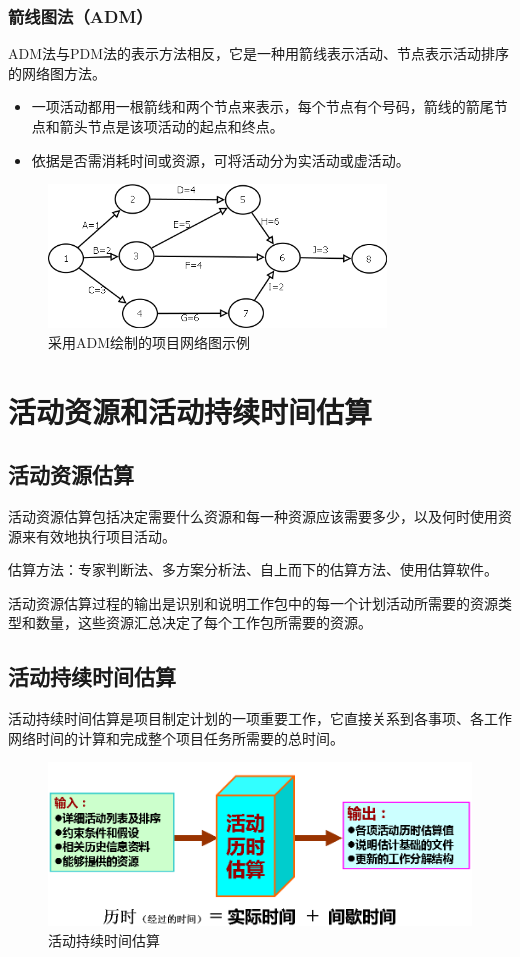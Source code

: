 \subsubsection{箭线图法（ADM）}
ADM法与PDM法的表示方法相反，它是一种用箭线表示活动、节点表示活动排序的网络图方法。
\begin{itemize}
	\item 一项活动都用一根箭线和两个节点来表示，每个节点有个号码，箭线的箭尾节点和箭头节点是该项活动的起点和终点。
	\item 依据是否需消耗时间或资源，可将活动分为实活动或虚活动。
\end{itemize}
\begin{figure}[!h]
	\centering
	\includegraphics[width=0.8\textwidth]{image/5-4}
	\caption{采用ADM绘制的项目网络图示例}
\end{figure}
\section{活动资源和活动持续时间估算}
\subsection{活动资源估算}
活动资源估算包括决定需要什么资源和每一种资源应该需要多少，以及何时使用资源来有效地执行项目活动。
\par 估算方法：专家判断法、多方案分析法、自上而下的估算方法、使用估算软件。
\par 活动资源估算过程的输出是识别和说明工作包中的每一个计划活动所需要的资源类型和数量，这些资源汇总决定了每个工作包所需要的资源。 
\subsection{活动持续时间估算}
活动持续时间估算是项目制定计划的一项重要工作，它直接关系到各事项、各工作网络时间的计算和完成整个项目任务所需要的总时间。
\begin{figure}[!h]
	\centering
	\includegraphics[width=\textwidth]{image/5-5}
	\caption{活动持续时间估算}
\end{figure}
